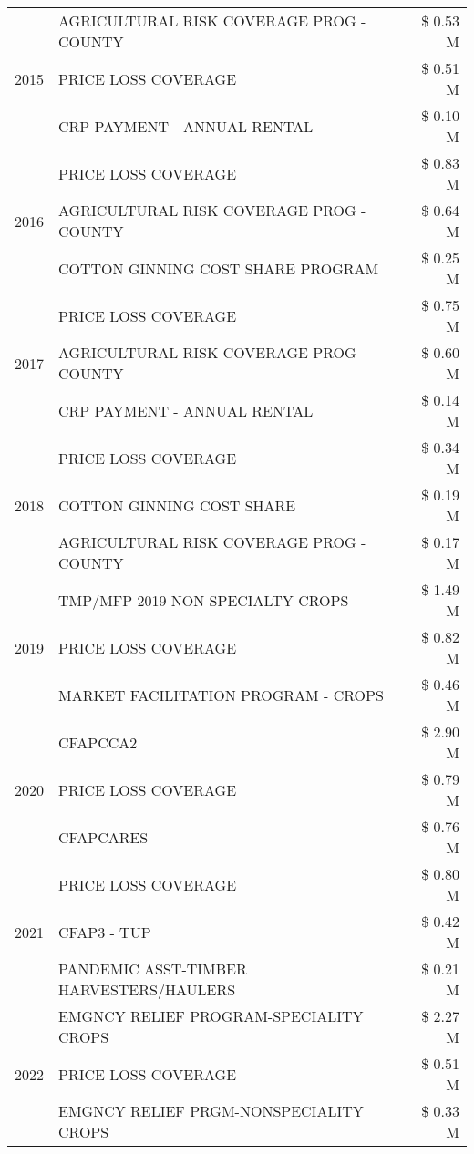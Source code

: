 \begin{tabular}{llr}
\cline{1-3}
\multirow[t]{3}{*}{2015} & AGRICULTURAL RISK COVERAGE PROG - COUNTY & \$ 0.53 M \\
 & PRICE LOSS COVERAGE & \$ 0.51 M \\
 & CRP PAYMENT - ANNUAL RENTAL & \$ 0.10 M \\
\cline{1-3}
\multirow[t]{3}{*}{2016} & PRICE LOSS COVERAGE & \$ 0.83 M \\
 & AGRICULTURAL RISK COVERAGE PROG - COUNTY & \$ 0.64 M \\
 & COTTON GINNING COST SHARE PROGRAM & \$ 0.25 M \\
\cline{1-3}
\multirow[t]{3}{*}{2017} & PRICE LOSS COVERAGE & \$ 0.75 M \\
 & AGRICULTURAL RISK COVERAGE PROG - COUNTY & \$ 0.60 M \\
 & CRP PAYMENT - ANNUAL RENTAL & \$ 0.14 M \\
\cline{1-3}
\multirow[t]{3}{*}{2018} & PRICE LOSS COVERAGE & \$ 0.34 M \\
 & COTTON GINNING COST SHARE & \$ 0.19 M \\
 & AGRICULTURAL RISK COVERAGE PROG - COUNTY & \$ 0.17 M \\
\cline{1-3}
\multirow[t]{3}{*}{2019} & TMP/MFP 2019 NON SPECIALTY CROPS & \$ 1.49 M \\
 & PRICE LOSS COVERAGE & \$ 0.82 M \\
 & MARKET FACILITATION PROGRAM - CROPS & \$ 0.46 M \\
\cline{1-3}
\multirow[t]{3}{*}{2020} & CFAPCCA2 & \$ 2.90 M \\
 & PRICE LOSS COVERAGE & \$ 0.79 M \\
 & CFAPCARES & \$ 0.76 M \\
\cline{1-3}
\multirow[t]{3}{*}{2021} & PRICE LOSS COVERAGE & \$ 0.80 M \\
 & CFAP3 - TUP & \$ 0.42 M \\
 & PANDEMIC ASST-TIMBER HARVESTERS/HAULERS & \$ 0.21 M \\
\cline{1-3}
\multirow[t]{3}{*}{2022} & EMGNCY RELIEF PROGRAM-SPECIALITY CROPS & \$ 2.27 M \\
 & PRICE LOSS COVERAGE & \$ 0.51 M \\
 & EMGNCY RELIEF PRGM-NONSPECIALITY CROPS & \$ 0.33 M \\
\cline{1-3}
\bottomrule
\end{tabular}
